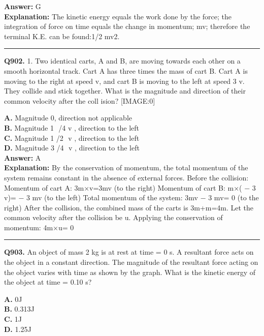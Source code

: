 \documentclass[12pt]{article}
\begin{document}
\textbf{Answer:} G \\
\textbf{Explanation:} The kinetic energy equals the work done by the force; the integration of force on time equals the change in momentum; mv; therefore the terminal K.E. can be found:1/2 mv2.

\hrule
\vspace{1em}


\noindent
\textbf{Q902.} 1.
Two identical carts, A and B, are moving towards each other on a smooth horizontal track. Cart A has three times the mass of cart B. Cart A is moving to the right at speed v, and cart B is moving to the left at speed
3
v. They collide and stick together. What is the magnitude and direction of their common velocity after the coll
ision?
[IMAGE:0]



\textbf{A.} Magnitude 0, direction not applicable \\
\textbf{B.} Magnitude 1
​
/4
v
, direction to the left \\
\textbf{C.} Magnitude 1
/2
​
v
, direction to the left \\
\textbf{D.} Magnitude 3
/4
​
v
, direction to the left \\

\textbf{Answer:} A \\
\textbf{Explanation:} By the conservation of momentum, the total momentum of the system remains constant in the absence of external forces. Before the collision:
\cdot 
Momentum of cart A: 3m×v=3mv (to the right)
\cdot 
Momentum of cart B: m×(
−
3
v)=
−
3
mv (to the left)
Total momentum of the system: 3mv
−
3
mv=
0
(to the right)
After the collision, the combined mass of the carts is 3m+m=4m. Let the common velocity after the collision be u. Applying the conservation of momentum:
4m×u=
0

\hrule
\vspace{1em}


\noindent
\textbf{Q903.} An object of mass 2 kg is at rest at time = 0 s. A resultant force acts on the object in a constant direction.
The magnitude of the resultant force acting on the object varies with time as shown by
the graph.
What is the kinetic energy of the object at time = 0.10 s?



\textbf{A.} 0J \\
\textbf{B.} 0.313J \\
\textbf{C.} 1J \\
\textbf{D.} 1.25J \\
\end{document}
